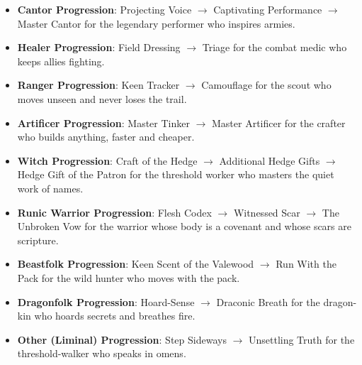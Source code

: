 \documentclass[12pt,a4paper]{book}
\begin{document}
\begin{itemize}
  \item \textbf{Cantor Progression}: Projecting Voice $\rightarrow$ Captivating Performance $\rightarrow$ Master Cantor for the legendary performer who inspires armies.
  \item \textbf{Healer Progression}: Field Dressing $\rightarrow$ Triage for the combat medic who keeps allies fighting.
  \item \textbf{Ranger Progression}: Keen Tracker $\rightarrow$ Camouflage for the scout who moves unseen and never loses the trail.
  \item \textbf{Artificer Progression}: Master Tinker $\rightarrow$ Master Artificer for the crafter who builds anything, faster and cheaper.
  \item \textbf{Witch Progression}: Craft of the Hedge $\rightarrow$ Additional Hedge Gifts $\rightarrow$ Hedge Gift of the Patron for the threshold worker who masters the quiet work of names.
  \item \textbf{Runic Warrior Progression}: Flesh Codex $\rightarrow$ Witnessed Scar $\rightarrow$ The Unbroken Vow for the warrior whose body is a covenant and whose scars are scripture.
  \item \textbf{Beastfolk Progression}: Keen Scent of the Valewood $\rightarrow$ Run With the Pack for the wild hunter who moves with the pack.
  \item \textbf{Dragonfolk Progression}: Hoard-Sense $\rightarrow$ Draconic Breath for the dragon-kin who hoards secrets and breathes fire.
  \item \textbf{Other (Liminal) Progression}: Step Sideways $\rightarrow$ Unsettling Truth for the threshold-walker who speaks in omens.
\end{itemize}
\end{document}
